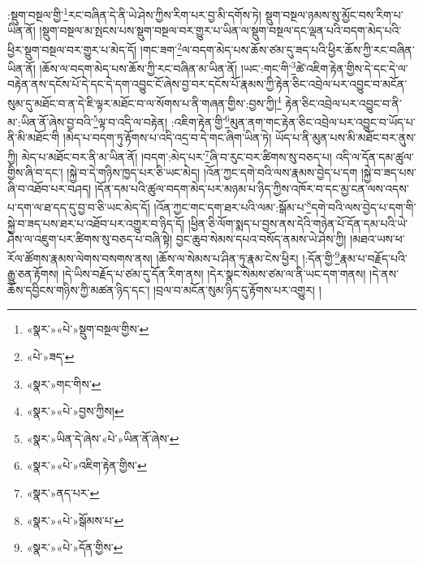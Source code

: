 :སྡུག་བསྔལ་གྱི་\footnote{«སྣར་»«པེ་»སྡུག་བསྔལ་གྱིས་}རང་བཞིན་དེ་ནི་ཡེ་ཤེས་ཀྱིས་རིག་པར་བྱ་མི་དགོས་ཏེ། སྡུག་བསྔལ་ཉམས་སུ་མྱོང་བས་རིག་པ་ཡིན་ནོ། །སྡུག་བསྔལ་མ་སྤངས་པས་སྡུག་བསྔལ་བར་གྱུར་པ་ཡིན་ལ་སྡུག་བསྔལ་དང་ལྡན་པའི་བདག་མེད་པའི་ཕྱིར་སྡུག་བསྔལ་བར་གྱུར་པ་མེད་དོ། །གང་ཟག་\footnote{«པེ་»ཟད་}ལ་བདག་མེད་པས་ཆོས་ཙམ་དུ་ཟད་པའི་ཕྱིར་ཆོས་ཀྱི་རང་བཞིན་ཡིན་ནོ། །ཆོས་ལ་བདག་མེད་པས་ཆོས་ཀྱི་རང་བཞིན་མ་ཡིན་ནོ། །ཡང་:གང་གི་\footnote{«སྣར་»གང་གིས་}ཚེ་འཇིག་རྟེན་གྱིས་དེ་དང་དེ་ལ་བརྟེན་ནས་དངོས་པོ་དེ་དང་དེ་དག་འབྱུང་ངོ་ཞེས་བྱ་བར་དངོས་པོ་རྣམས་ཀྱི་རྟེན་ཅིང་འབྲེལ་པར་འབྱུང་བ་མངོན་སུམ་དུ་མཐོང་བ་ན་དེ་ཇི་ལྟར་མཐོང་བ་ལ་སོགས་པ་ནི་གཞན་གྱིས་:བྱས་ཀྱི།\footnote{«སྣར་»«པེ་»བྱས་ཀྱིས།} རྟེན་ཅིང་འབྲེལ་པར་འབྱུང་བ་ནི་མ་:ཡིན་ནོ་ཞེས་བྱ་བའི་\footnote{«སྣར་»ཡིན་དེ་ཞེས་«པེ་»ཡིན་ནོ་ཞེས་}ལྟ་བ་འདི་ལ་བརྟེན། :འཇིག་རྟེན་གྱི་\footnote{«སྣར་»«པེ་»འཇིག་རྟེན་གྱིས་}མུན་ནག་གང་རྟེན་ཅིང་འབྲེལ་པར་འབྱུང་བ་ཡོད་པ་ནི་མི་མཐོང་གི །མེད་པ་བདག་ཏུ་རྟོགས་པ་འདི་འདྲ་བ་དེ་གང་ཞིག་ཡིན་ཏེ། ཡོད་པ་ནི་མུན་པས་མི་མཐོང་བར་ནུས་ཀྱི། མེད་པ་མཐོང་བར་ནི་མ་ཡིན་ནོ། །བདག་:མེད་པར་\footnote{«སྣར་»ནད་པར་}ཞི་བ་རུང་བར་ཚིགས་སུ་བཅད་པ། འདི་ལ་དོན་དམ་ཚུལ་གྱིས་ཞི་བ་དང་། །སྐྱེ་བ་དེ་གཉིས་ཁྱད་པར་ཅི་ཡང་མེད། །འོན་ཀྱང་དགེ་བའི་ལས་རྣམས་བྱེད་པ་དག །སྐྱེ་བ་ཟད་པས་ཞི་བ་འཐོབ་པར་བཤད། །དོན་དམ་པའི་ཚུལ་བདག་མེད་པར་མཉམ་པ་ཉིད་ཀྱིས་འཁོར་བ་དང་མྱ་ངན་ལས་འདས་པ་དག་ལ་ཐ་དད་དུ་བྱ་བ་ཅི་ཡང་མེད་དོ། །འོན་ཀྱང་གང་དག་ཐར་པའི་ལམ་:སྒོམ་པ་\footnote{«སྣར་»«པེ་»སྒོམས་པ་}དགེ་བའི་ལས་བྱེད་པ་དག་གི་སྐྱེ་བ་ཟད་པས་ཐར་པ་འཐོབ་པར་འགྱུར་བ་ཉིད་དོ། །ཕྱིན་ཅི་ལོག་སྨད་པ་བྱས་ནས་དེའི་གཉེན་པོ་དོན་དམ་པའི་ཡེ་ཤེས་ལ་འཇུག་པར་ཚིགས་སུ་བཅད་པ་བཞི་སྟེ། བྱང་ཆུབ་སེམས་དཔའ་བསོད་ནམས་ཡེ་ཤེས་ཀྱི། །མཐའ་ཡས་ཕ་རོལ་ཚོགས་རྣམས་ལེགས་བསགས་ནས། །ཆོས་ལ་སེམས་པ་ཤིན་ཏུ་རྣམ་ངེས་ཕྱིར། །:དོན་གྱི་\footnote{«སྣར་»«པེ་»དོན་གྱིས་}རྣམ་པ་བརྗོད་པའི་རྒྱུ་ཅན་རྟོགས། །དེ་ཡིས་བརྗོད་པ་ཙམ་དུ་དོན་རིག་ནས། །དེར་སྣང་སེམས་ཙམ་ལ་ནི་ཡང་དག་གནས། །དེ་ནས་ཆོས་དབྱིངས་གཉིས་ཀྱི་མཚན་ཉིད་དང་། །བྲལ་བ་མངོན་སུམ་ཉིད་དུ་རྟོགས་པར་འགྱུར། །
